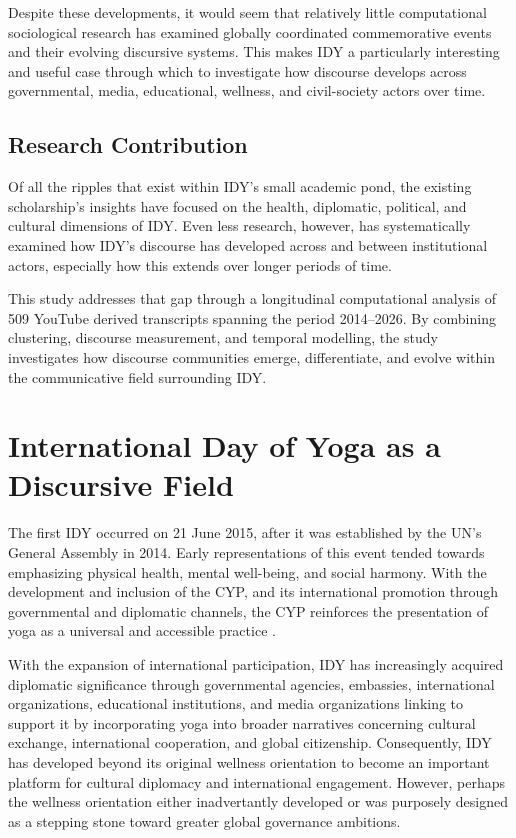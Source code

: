 \documentclass[11pt]{article}
\begin{document}
Despite these developments, it would seem that relatively little computational sociological research has examined globally coordinated commemorative events and their  evolving discursive systems. This makes IDY a particularly interesting and useful case through which to investigate how discourse develops across governmental, media, educational, wellness, and civil-society actors over time.


\subsection{Research Contribution}

Of all the ripples that exist within IDY's small academic pond, the existing scholarship's insights have focused on the health, diplomatic, political, and cultural dimensions of IDY. Even less research, however, has systematically examined how IDY's discourse has developed across and between institutional actors, especially how this extends over longer periods of time.

This study addresses that gap through a longitudinal computational analysis of 509 YouTube derived transcripts spanning the period 2014--2026. By combining clustering, discourse measurement, and temporal modelling, the study investigates how discourse communities emerge, differentiate, and evolve within the communicative field surrounding IDY.



\section{International Day of Yoga as a Discursive Field}

The first IDY occurred on 21 June 2015, after it was established by the UN's General Assembly in 2014. Early representations of this event tended towards emphasizing physical health, mental well-being, and social harmony. With the development and inclusion of the CYP, and its international promotion through governmental and diplomatic channels, the CYP reinforces the presentation of yoga as a universal and accessible practice \cite{indiandiplomacy2017}.

With the expansion of international participation, IDY has increasingly acquired diplomatic significance through governmental agencies, embassies, international organizations, educational institutions, and media organizations linking to support it by incorporating yoga into broader narratives concerning cultural exchange, international cooperation, and global citizenship. Consequently, IDY has developed beyond its original wellness orientation to become an important platform for cultural diplomacy and international engagement. However, perhaps the wellness orientation either inadvertantly developed or was purposely designed as a stepping stone toward greater global governance ambitions.
\end{document}
